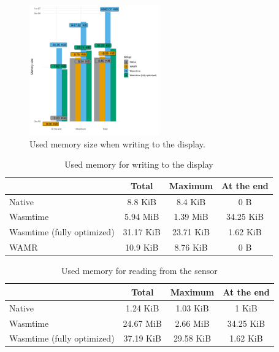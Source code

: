 \begin{figure}
  \centering
  \includegraphics[width=0.5\textwidth]{figures/display_memory}
  \caption{Used memory size when writing to the display.}
\end{figure}

\begin{table}[h]
	\centering
	\captionsetup{justification=centering}
	\begin{tabular}{l c c c}
		\toprule
                  & Total & Maximum & At the end \\ \midrule
      Native    & 8.8 KiB & 8.4 KiB & 0 B \\
      Wasmtime  &  5.94 MiB & 1.39 MiB & 34.25 KiB \\
      Wasmtime (fully optimized) & 31.17 KiB & 23.71 KiB & 1.62 KiB \\
      WAMR  &  10.9 KiB & 8.76 KiB & 0 B \\
		\bottomrule
	\end{tabular}
    \caption{Used memory for writing to the display}
\end{table}

\begin{table}[h]
	\centering
	\captionsetup{justification=centering}
	\begin{tabular}{l c c c}
		\toprule
                  & Total & Maximum & At the end \\ \midrule
      Native    & 1.24 KiB & 1.03 KiB & 1 KiB \\
      Wasmtime  & 24.67 MiB & 2.66 MiB & 34.25 KiB \\
      Wasmtime (fully optimized) &  37.19 KiB & 29.58 KiB & 1.62 KiB \\
		\bottomrule
	\end{tabular}
    \caption{Used memory for reading from the sensor}
\end{table}

